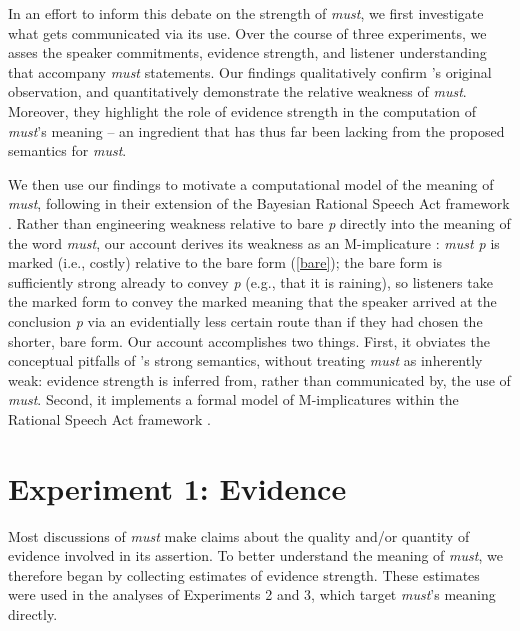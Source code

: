 \documentclass[10pt,letterpaper]{article}
\begin{document}
In an effort to inform this debate on the strength of \emph{must}, we first investigate what gets communicated via its use. Over the course of three experiments, we asses the speaker commitments, evidence strength, and listener understanding that accompany \emph{must} statements. Our findings qualitatively confirm \citeauthor{karttunen1972}'s original observation, and quantitatively demonstrate the relative weakness of \emph{must}. Moreover, they highlight the role of evidence strength in the computation of \emph{must}'s meaning -- an ingredient that has thus far been lacking from the proposed semantics for \emph{must}.

We then use our findings to motivate a computational model of the meaning of \emph{must}, following  in their extension of the Bayesian Rational Speech Act framework \cite{frankgoodman2012}. Rather than engineering weakness relative to bare \emph{p} directly into the meaning of the word \emph{must}, our account derives its weakness as an M-implicature \cite{levinson2000}: \emph{must p} is marked (i.e., costly) relative to the bare form (\ref{bare}); the bare form is sufficiently strong already to convey \emph{p} (e.g., that it is raining), so listeners take the marked form to convey the marked meaning that the speaker arrived at the conclusion \emph{p} via an evidentially less certain route than if they had chosen the shorter, bare form. Our account accomplishes two things. First, it obviates the conceptual pitfalls of \citeauthor{vonfintelgillies2010}'s strong semantics, without treating \emph{must} as inherently weak: evidence strength is inferred from, rather than communicated by, the use of \emph{must}. Second, it implements a formal model of M-implicatures within the Rational Speech Act framework \cite{bergenetal2014}.



\section{Experiment 1: Evidence}

Most discussions of \emph{must} make claims about the quality and/or quantity of evidence involved in its assertion. To better understand the meaning of \emph{must}, we therefore began by collecting estimates of evidence strength. These estimates were used in the analyses of Experiments 2 and 3, which target \emph{must}'s meaning directly.
\end{document}
